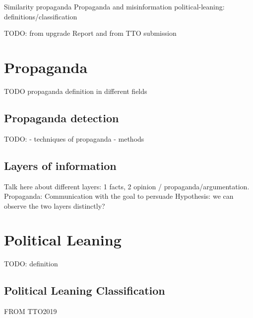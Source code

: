 Similarity
\gls{propaganda}
Propaganda and misinformation
\Gls{political-leaning}: definitions/classification


TODO: from upgrade Report and from TTO submission

\section{Propaganda}
\label{sec:lit_propaganda}

TODO propaganda definition in different fields

\subsection{Propaganda detection}
\label{ssec:lit_propaganda_detection}

TODO: 
- techniques of propaganda
- methods

\subsection{Layers of information}
\label{ssec:lit_layers_of_info}

Talk here about different layers: 1 facts, 2 opinion / propaganda/argumentation.
Propaganda: Communication with the goal to persuade
Hypothesis: we can observe the two layers distinctly?

\section{Political Leaning}
\label{sec:lit_leaning}

TODO: definition

\subsection{Political Leaning Classification}
\label{ssec:lit_leaning_classification}

FROM TTO2019



